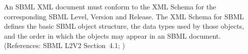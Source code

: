An SBML XML document must conform to the XML Schema for the corresponding
SBML Level, Version and Release.  The XML Schema for SBML defines the basic
SBML object structure, the data types used by those objects, and the order
in which the objects may appear in an SBML document.  (References: SBML
L2V2 Section~4.1; )
